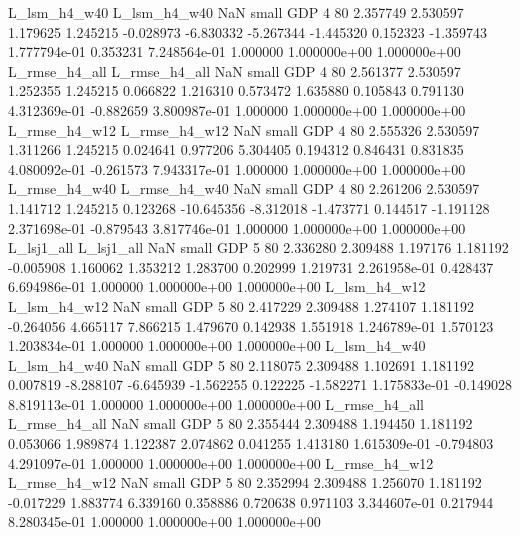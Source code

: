  L_lsm_h4_w40  L_lsm_h4_w40                   NaN      small      GDP                 4 80 2.357749       2.530597 1.179625       1.245215   -0.028973     -6.830332     -5.267344    -1.445320       0.152323 -1.359743 1.777794e-01     0.353231   7.248564e-01            1.000000    1.000000e+00        1.000000e+00
L_rmse_h4_all L_rmse_h4_all                   NaN      small      GDP                 4 80 2.561377       2.530597 1.252355       1.245215    0.066822      1.216310      0.573472     1.635880       0.105843  0.791130 4.312369e-01    -0.882659   3.800987e-01            1.000000    1.000000e+00        1.000000e+00
L_rmse_h4_w12 L_rmse_h4_w12                   NaN      small      GDP                 4 80 2.555326       2.530597 1.311266       1.245215    0.024641      0.977206      5.304405     0.194312       0.846431  0.831835 4.080092e-01    -0.261573   7.943317e-01            1.000000    1.000000e+00        1.000000e+00
L_rmse_h4_w40 L_rmse_h4_w40                   NaN      small      GDP                 4 80 2.261206       2.530597 1.141712       1.245215    0.123268    -10.645356     -8.312018    -1.473771       0.144517 -1.191128 2.371698e-01    -0.879543   3.817746e-01            1.000000    1.000000e+00        1.000000e+00
   L_lsj1_all    L_lsj1_all                   NaN      small      GDP                 5 80 2.336280       2.309488 1.197176       1.181192   -0.005908      1.160062      1.353212     1.283700       0.202999  1.219731 2.261958e-01     0.428437   6.694986e-01            1.000000    1.000000e+00        1.000000e+00
 L_lsm_h4_w12  L_lsm_h4_w12                   NaN      small      GDP                 5 80 2.417229       2.309488 1.274107       1.181192   -0.264056      4.665117      7.866215     1.479670       0.142938  1.551918 1.246789e-01     1.570123   1.203834e-01            1.000000    1.000000e+00        1.000000e+00
 L_lsm_h4_w40  L_lsm_h4_w40                   NaN      small      GDP                 5 80 2.118075       2.309488 1.102691       1.181192    0.007819     -8.288107     -6.645939    -1.562255       0.122225 -1.582271 1.175833e-01    -0.149028   8.819113e-01            1.000000    1.000000e+00        1.000000e+00
L_rmse_h4_all L_rmse_h4_all                   NaN      small      GDP                 5 80 2.355444       2.309488 1.194450       1.181192    0.053066      1.989874      1.122387     2.074862       0.041255  1.413180 1.615309e-01    -0.794803   4.291097e-01            1.000000    1.000000e+00        1.000000e+00
L_rmse_h4_w12 L_rmse_h4_w12                   NaN      small      GDP                 5 80 2.352994       2.309488 1.256070       1.181192   -0.017229      1.883774      6.339160     0.358886       0.720638  0.971103 3.344607e-01     0.217944   8.280345e-01            1.000000    1.000000e+00        1.000000e+00
